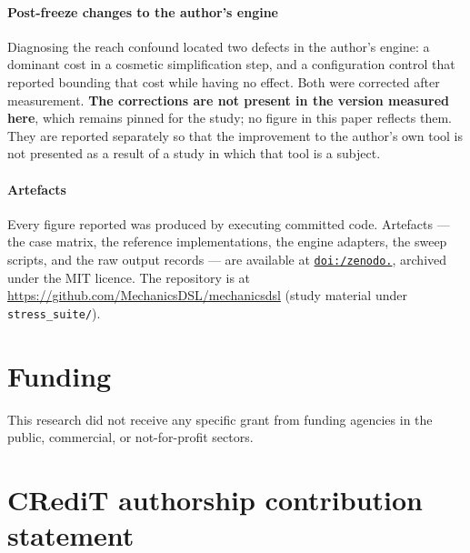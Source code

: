 \documentclass[review,12pt]{elsarticle}
\begin{document}
\paragraph{Post-freeze changes to the author's engine}
Diagnosing the reach confound located two defects in the author's engine:
a dominant cost in a cosmetic simplification step, and a configuration
control that reported bounding that cost while having no effect. Both were
corrected after measurement. \textbf{The corrections are not present in the
version measured here}, which remains pinned for the study; no figure in this
paper reflects them. They are reported separately so that the improvement to
the author's own tool is not presented as a result of a study in which that
tool is a subject.

\paragraph{Artefacts}
Every figure reported was produced by executing committed code. Artefacts ---
the case matrix, the reference implementations, the engine adapters, the sweep
scripts, and the raw output records --- are available at
\href{https://doi.org/10.5281/zenodo.22315172}{\texttt{doi:/\allowbreak zenodo.}},
archived under the MIT licence. The repository is at
\url{https://github.com/MechanicsDSL/mechanicsdsl} (study material under
\texttt{stress\_suite/}).

\section*{Funding}

This research did not receive any specific grant from funding agencies in the
public, commercial, or not-for-profit sectors.

\section*{CRediT authorship contribution statement}
\end{document}
